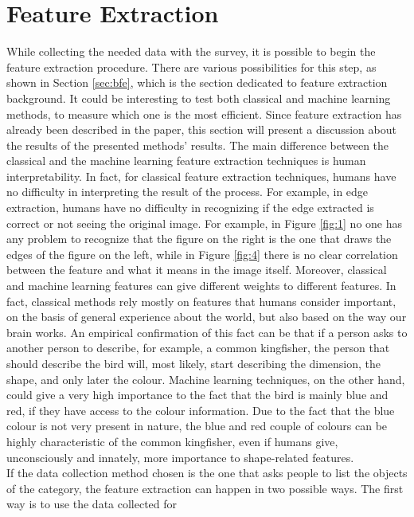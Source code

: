 \documentclass[conference]{IEEEtran}
\begin{document}
	\section{Feature Extraction\label{sec:fe}}

		\noindent While collecting the needed data with the survey, it is possible to begin the feature extraction procedure. There are various possibilities for this step, as shown in Section \ref{sec:bfe}, which is
		the section dedicated to feature extraction background. 
		It could be interesting to test both classical and machine learning methods, to measure which one is the most efficient. Since feature extraction has already been described in the paper, this section will 
		present a discussion about the results of the presented methods' results. The main difference between the classical and the machine learning feature extraction techniques is human interpretability. 
		In fact, for classical feature extraction techniques, humans have no difficulty in interpreting the result of the process. For example, in edge extraction, humans have no difficulty in recognizing if the 
		edge extracted is correct or not seeing the original image. For example, in Figure \ref{fig:1} no one has any problem to recognize that the figure on the right is the one that draws the edges of the figure on the left, 
		while in Figure \ref{fig:4} there is no clear correlation between the feature and what it means in the image itself.
		Moreover, classical and machine learning features can give different weights to different features. 
		In fact, classical methods rely mostly on features that humans consider important, on the basis of general experience about the world, but also based on the way our brain works. An empirical confirmation of this fact 
		can be that if a person asks to another person to describe, for example, a common kingfisher, the person that should describe the bird will, most likely, start describing the dimension, the shape, and only 
		later the colour. Machine learning techniques, on the other hand, could give a very high importance to the fact that the bird is mainly blue and red, if they have access to the colour information. Due to the fact that 
		the blue colour is not very present in nature, the blue and red couple of colours can be highly characteristic of the common kingfisher, even if humans give, unconsciously and innately, more importance to 
		shape-related features.	\\
		If the data collection method chosen is the one that asks people to list the objects of the category, the feature extraction can happen in two possible ways. The first way is to use the data collected for 
\end{document}
